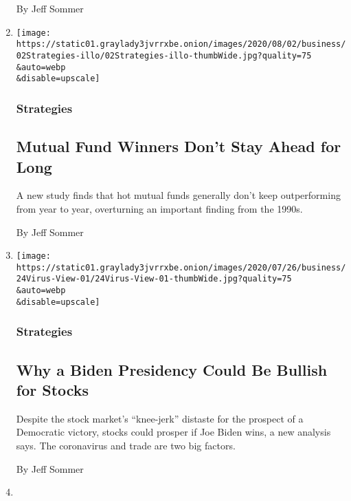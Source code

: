 \begin{enumerate}
  By Jeff Sommer
\item
  \href{/2020/07/31/business/mutual-fund-winners-stocks-bonds.html}{}

  \texttt{[image: https://static01.graylady3jvrrxbe.onion/images/2020/08/02/business/02Strategies-illo/02Strategies-illo-thumbWide.jpg?quality=75\\\&auto=webp\\\&disable=upscale]}

  \hypertarget{strategies-2}{%
  \subsubsection{Strategies}\label{strategies-2}}

  \hypertarget{mutual-fund-winners-dont-stay-ahead-for-long}{%
  \subsection{Mutual Fund Winners Don't Stay Ahead for
  Long}\label{mutual-fund-winners-dont-stay-ahead-for-long}}

  A new study finds that hot mutual funds generally don't keep
  outperforming from year to year, overturning an important finding from
  the 1990s.

  By Jeff Sommer
\item
  \href{/2020/07/24/business/joe-biden-stocks-taxes.html}{}

  \texttt{[image: https://static01.graylady3jvrrxbe.onion/images/2020/07/26/business/24Virus-View-01/24Virus-View-01-thumbWide.jpg?quality=75\\\&auto=webp\\\&disable=upscale]}

  \hypertarget{strategies-3}{%
  \subsubsection{Strategies}\label{strategies-3}}

  \hypertarget{why-a-biden-presidency-could-be-bullish-for-stocks}{%
  \subsection{Why a Biden Presidency Could Be Bullish for
  Stocks}\label{why-a-biden-presidency-could-be-bullish-for-stocks}}

  Despite the stock market's ``knee-jerk'' distaste for the prospect of
  a Democratic victory, stocks could prosper if Joe Biden wins, a new
  analysis says. The coronavirus and trade are two big factors.

  By Jeff Sommer
\item
  \href{/2020/07/11/business/mutual-fund-investing.html}{}


\end{enumerate}
